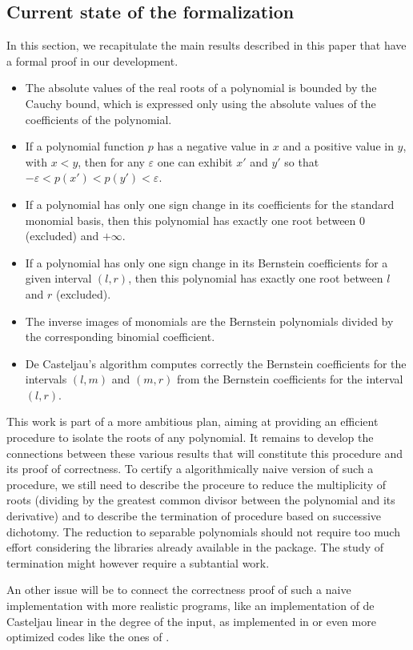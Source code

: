 \documentclass{mscs}
\begin{document}
\subsection{Current state of the formalization}
In this section, we recapitulate the main results described in this paper
that have a formal proof in our development.
\begin{itemize}
\item The absolute values of the real roots of a polynomial is bounded
  by the Cauchy bound, which is expressed only using the absolute
  values of the coefficients of the polynomial.
\item If a polynomial function \(p\)
has a negative value in \(x\) and a positive
value in \(y\), with \(x < y\), then for any \(\varepsilon\) one can
exhibit \(x'\) and \(y'\) so that \(-\varepsilon < p(x') < p(y') < \varepsilon\).
\item If a polynomial has only one sign change in its coefficients for the
standard monomial basis, then this polynomial has exactly one root between
\(0\) (excluded) and \(+\infty\).
\item If a polynomial has only one sign change in its Bernstein coefficients
for a given interval \((l,r)\), then this polynomial has exactly one root
between \(l\) and \(r\) (excluded).
\item The inverse images of monomials are the Bernstein polynomials divided
by the corresponding binomial coefficient.
\item De Casteljau's algorithm computes correctly the Bernstein coefficients
for the intervals \((l,m)\) and \((m,r)\) from the Bernstein coefficients
for the interval \((l,r)\).
\end{itemize}
This work is part of a more ambitious plan, aiming at providing an
efficient procedure
to isolate the roots of any polynomial.  It remains to develop the connections
between these various results that will constitute this procedure and its proof
of correctness. To certify a algorithmically naive version of such a
procedure, we still need to describe the proceure to reduce the
multiplicity of roots (dividing by the greatest common divisor
between the polynomial and its derivative) and to describe the termination
of procedure based on successive dichotomy. The reduction to separable
polynomials should not require too much effort considering the
libraries already available in the \ssr{} package. The study of
termination might however require a subtantial work.

An other issue will be to connect the correctness proof of such a
naive implementation with more realistic programs, like an
implementation of de Casteljau linear in the degree of the input, as
implemented in \cite{caadcoq} or even more optimized codes like the
ones of \cite{mourrainetal}.
\end{document}
